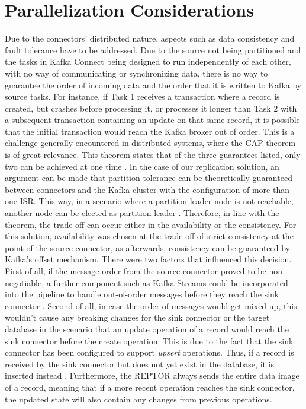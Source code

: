 \section{Parallelization Considerations}
\label{ch04:pipelinedevelopment:parallelizationconsiderations}
Due to the connectors' distributed nature, aspects such as data consistency and fault tolerance have to be addressed. Due to the source not being partitioned and the tasks in Kafka Connect being designed to run independently of each other, with no way of communicating or synchronizing data, there is no way to guarantee the order of incoming data and the order that it is written to Kafka by source tasks. For instance, if Task 1 receives a transaction where a record is created, but crashes before processing it, or processes it longer than Task 2 with a subsequent transaction containing an update on that same record, it is possible that the initial transaction would reach the Kafka broker out of order. This is a challenge generally encountered in distributed systems, where the \ac{CAP} theorem is of great relevance. This theorem states that of the three guarantees listed, only two can be achieved at one time \cite{nookala2022distributedshift}. In the case of our replication solution, an argument can be made that partition tolerance can be theoretically guaranteed between connectors and the Kafka cluster with the configuration of more than one \ac{ISR}. This way, in a scenario where a partition leader node is not reachable, another node can be elected as partition leader \cite{optimizingkafkacap}. Therefore, in line with the theorem, the trade-off can occur either in the availability or the consistency. For this solution, availability was chosen at the trade-off of strict consistency at the point of the source connector, as afterwards, consistency can be guaranteed by Kafka's offset mechanism. There were two factors that influenced this decision. First of all, if the message order from the source connector proved to be non-negotiable, a further component such as Kafka Streams could be incorporated into the pipeline to handle out-of-order messages before they reach the sink connector \cite{wang2021consistency}. Second of all, in case the order of messages would get mixed up, this wouldn't cause any breaking changes for the sink connector or the target database in the scenario that an update operation of a record would reach the sink connector before the create operation. This is due to the fact that the sink connector has been configured to support \textit{upsert} operations. Thus, if a record is received by the sink connector but does not yet exist in the database, it is inserted instead \cite{jdbcsinkdocumentation}. Furthermore, the \ac{REPTOR} always sends the entire data image of a record, meaning that if a more recent operation reaches the sink connector, the updated state will also contain any changes from previous operations.

